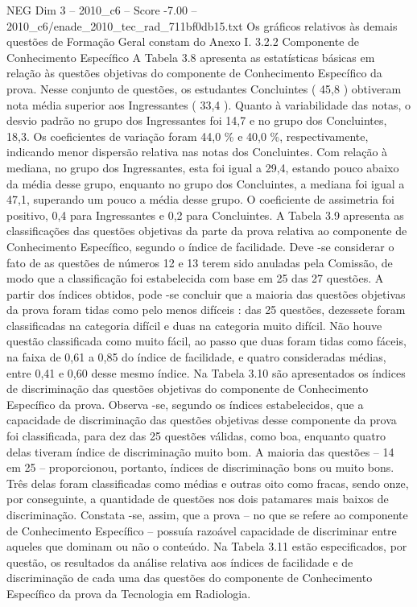 \begin{textsample}{NEG Dim 3 – 2010\_c6 – Score -7.00 – 2010\_c6/enade\_2010\_tec\_rad\_711bf0db15.txt}
Os gráficos relativos às demais questões de Formação Geral constam do Anexo I. 3.2.2 Componente de Conhecimento Específico A Tabela 3.8 apresenta as estatísticas básicas em relação às questões objetivas do componente de Conhecimento Específico da prova.
Nesse conjunto de questões, os estudantes Concluintes ( 45,8 ) obtiveram nota média superior aos Ingressantes ( 33,4 ).
Quanto à variabilidade das notas, o desvio padrão no grupo dos Ingressantes foi 14,7 e no grupo dos Concluintes, 18,3.
Os coeficientes de variação foram 44,0 \% e 40,0 \%, respectivamente, indicando menor dispersão relativa nas notas dos Concluintes.
Com relação à mediana, no grupo dos Ingressantes, esta foi igual a 29,4, estando pouco abaixo da média desse grupo, enquanto no grupo dos Concluintes, a mediana foi igual a 47,1, superando um pouco a média desse grupo.
O coeficiente de assimetria foi positivo, 0,4 para Ingressantes e 0,2 para Concluintes.
A Tabela 3.9 apresenta as classificações das questões objetivas da parte da prova relativa ao componente de Conhecimento Específico, segundo o índice de facilidade.
Deve -se considerar o fato de as questões de números 12 e 13 terem sido anuladas pela Comissão, de modo que a classificação foi estabelecida com base em 25 das 27 questões.
A partir dos índices obtidos, pode -se concluir que a maioria das questões objetivas da prova foram tidas como pelo menos difíceis : das 25 questões, dezessete foram classificadas na categoria difícil e duas na categoria muito difícil.
Não houve questão classificada como muito fácil, ao passo que duas foram tidas como fáceis, na faixa de 0,61 a 0,85 do índice de facilidade, e quatro consideradas médias, entre 0,41 e 0,60 desse mesmo índice.
Na Tabela 3.10 são apresentados os índices de discriminação das questões objetivas do componente de Conhecimento Específico da prova.
Observa -se, segundo os índices estabelecidos, que a capacidade de discriminação das questões objetivas desse componente da prova foi classificada, para dez das 25 questões válidas, como boa, enquanto quatro delas tiveram índice de discriminação muito bom.
A maioria das questões – 14 em 25 – proporcionou, portanto, índices de discriminação bons ou muito bons.
Três delas foram classificadas como médias e outras oito como fracas, sendo onze, por conseguinte, a quantidade de questões nos dois patamares mais baixos de discriminação.
Constata -se, assim, que a prova – no que se refere ao componente de Conhecimento Específico – possuía razoável capacidade de discriminar entre aqueles que dominam ou não o conteúdo.
Na Tabela 3.11 estão especificados, por questão, os resultados da análise relativa aos índices de facilidade e de discriminação de cada uma das questões do componente de Conhecimento Específico da prova da Tecnologia em Radiologia.

\end{textsample}

